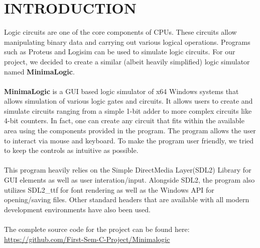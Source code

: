 \documentclass[report]{subfiles}
\begin{document}
\chapter{INTRODUCTION}
    Logic circuits are one of the core components of CPUs. These circuits allow manipulating binary data and carrying out various logical operations.
    Programs such as Proteus and Logisim can be used to simulate logic circuits.
    For our project, we decided to create a similar (albeit heavily simplified) logic simulator named \textbf{MinimaLogic}.
    \\\\
    \textbf{MinimaLogic} is a GUI based logic simulator of x64 Windows systems that allows simulation of various logic gates and circuits.
    It allows users to create and simulate circuits ranging from a simple 1-bit adder to more complex circuits like 4-bit counters.
    In fact, one can create any circuit that fits within the available area using the components provided in the program.
    The program allows the user to interact via mouse and keyboard. To make the program user friendly, we tried to keep the controls as intuitive as possible.
    \\\\
    This program heavily relies on the Simple DirectMedia Layer(SDL2) Library for GUI elements as well as user interation/input. 
    Alongside SDL2, the program also utilizes SDL2\_ttf for font rendering as well as the Windows API for opening/saving files.
    Other standard headers that are available with all modern development environments have also been used.
    \\\\
    The complete source code for the project can be found here:\\
    \url{https://github.com/First-Sem-C-Project/Minimalogic}
\end{document}
